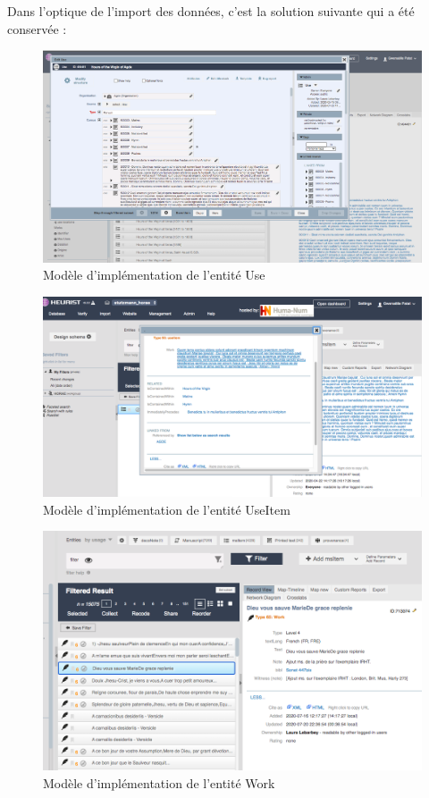 \documentclass[a4paper,12pt,twoside]{book}
\begin{document}
    Dans l'optique de l'import des données, c'est la solution suivante qui a été conservée :

    \begin{figure}[!h]
    \centering
    \includegraphics[width=15cm]{img/Modelisation/choix_final_use.png}
    \caption{Modèle d'implémentation de l'entité Use}
    \end{figure}
    
    \begin{figure}[!h]
    \centering
    \includegraphics[width=15cm]{img/Modelisation/choix_final_useItem.png}
    \caption{Modèle d'implémentation de l'entité UseItem}
    \end{figure}
    \clearpage
    
    \begin{figure}[!h]
    \centering
    \includegraphics[width=15cm]{img/Modelisation/choix_final_work.png}
    \caption{Modèle d'implémentation de l'entité Work}
    \end{figure}
    
\end{document}

